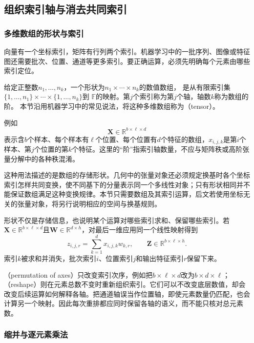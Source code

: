 \subsection{组织索引轴与消去共同索引}

\subsubsection{多维数组的形状与索引}

向量有一个坐标索引，矩阵有行列两个索引。机器学习中的一批序列、图像或特征图还需要批次、位置、通道等更多索引。要正确运算，必须先明确每个元素由哪些索引定位。
\begin{definition}[多维数值数组]
\label{def:linear-algebra-multidimensional-array}
给定正整数$n_1,\ldots,n_k$，一个形状为$n_1\times\cdots\times n_k$的数值数组，
是从有限索引集$\{1,\ldots,n_1\}\times\cdots\times\{1,\ldots,n_k\}$到
$\mathbb F$的映射。第$j$个索引称为第$j$个轴，轴数$k$称为数组的阶。
本节沿用机器学习中的常见说法，将这种多维数组称为（tensor）。
\end{definition}
例如
\[
  \bm{X}\in
  \mathbb{R}^{b\times \ell\times d}
\]
表示含$b$个样本、每个样本有$\ell$个位置、每个位置有$d$个特征的数组，$x_{i,j,k}$是第$i$个样本、第$j$个位置的第$k$个特征。这里的“阶”指索引轴数量，不应与矩阵秩或高阶张量分解中的各种秩混淆。

这种用法描述的是数组的存储形状。几何中的张量对象还必须规定换基时各个坐标索引怎样共同变换，使不同基下的分量表示同一个多线性对象；只有形状相同并不能保证数组满足这种变换规律。本节只需要数组及其索引运算，后文若使用坐标无关的张量对象，将另行说明相应的空间与换基规则。

形状不仅是存储信息，也说明某个运算对哪些索引求和、保留哪些索引。若$\bm{X}\in\mathbb{R}^{b\times\ell\times d}$且$\bm{W}\in\mathbb{R}^{d\times h}$，对最后一维应用同一个线性映射得到
\[
  z_{i,j,r}
  =
  \sum_{k=1}^{d}x_{i,j,k}w_{k,r},
  \qquad
  \bm{Z}\in\mathbb{R}^{b\times\ell\times h}.
\]
索引$k$被求和并消失，批次索引$i$、位置索引$j$和输出特征索引$r$保留下来。

（permutation of axes）只改变索引次序，例如把$b\times\ell\times d$改为$b\times d\times\ell$；（reshape）则在元素总数不变时重新组织索引。它们可以不改变底层数值，却会改变后续运算如何解释各轴。把通道轴误当作位置轴，即使元素数量仍匹配，也会计算另一个映射。因此每次重排都应同时保留各轴的语义，而不能只核对总元素数。

\subsubsection{缩并与逐元素乘法}

